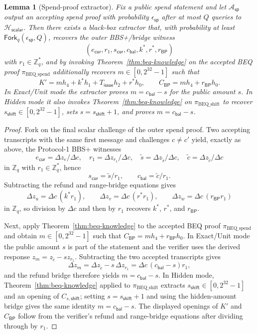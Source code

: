 \documentclass[11pt]{article}
\theoremstyle{definitionstyle}
\newtheorem{lemma}[theorem]{Lemma}
\theoremstyle{plain}
\begin{document}
\begin{lemma}[Spend-proof extractor]
\label{lem:spend-extractor}
Fix a public spend statement and let $\mathcal{A}_{\mathsf{sp}}$ output an accepting spend proof with probability $\epsilon_{\mathsf{sp}}$ after at most $Q$ queries to $\mathcal{H}_{\mathsf{scalar}}$. Then there exists a black-box extractor that, with probability at least $\mathsf{Fork}_q(\epsilon_{\mathsf{sp}},Q)$, recovers the outer BBS+/bridge witness
\[
(e_{\mathsf{cur}},r_1,s_{\mathsf{cur}},c_{\mathsf{bal}},k^*,r^*,r_{\mathsf{BP}})
\]
with $r_1 \in \mathbb{Z}_q^*$, and by invoking Theorem~\ref{thm:beq-knowledge} on the accepted BEQ proof $\pi_{\text{BEQ\_spend}}$ additionally recovers $m \in [0,2^{32}-1]$ such that
\[
K' = m h_4 + k^* h_1 + T_{\mathsf{issue}} h_2 + r^* h_0,
\qquad
C_{\mathsf{BP}} = m h_4 + r_{\mathsf{BP}} h_0.
\]
In Exact/Unit mode the extractor proves $m = c_{\mathsf{bal}}-s$ for the public amount $s$. In Hidden mode it also invokes Theorem~\ref{thm:beq-knowledge} on $\pi_{\text{BEQ\_shift}}$ to recover $s_{\mathsf{shift}} \in [0,2^{32}-1]$, sets $s = s_{\mathsf{shift}}+1$, and proves $m = c_{\mathsf{bal}}-s$.
\end{lemma}
\begin{proof}
Fork on the final scalar challenge of the outer spend proof. Two accepting transcripts with the same first message and challenges $c \neq c'$ yield, exactly as above, the Protocol-1 BBS+ witnesses
\[
e_{\mathsf{cur}} = \Delta z_e/\Delta c,\quad r_1 = \Delta z_{r_1}/\Delta c,\quad \tilde{s}=\Delta z_{\tilde{s}}/\Delta c,\quad \tilde{c}=\Delta z_{\tilde{c}}/\Delta c
\]
in $\mathbb{Z}_q$ with $r_1 \in \mathbb{Z}_q^*$, hence
\[
s_{\mathsf{cur}} = \tilde{s}/r_1,
\qquad
c_{\mathsf{bal}} = \tilde{c}/r_1.
\]
Subtracting the refund and range-bridge equations gives
\[
\Delta z_u = \Delta c\,(k^* r_1),\qquad \Delta z_v = \Delta c\,(r^* r_1),\qquad \Delta z_w = \Delta c\,(r_{\mathsf{BP}} r_1)
\]
in $\mathbb{Z}_q$, so division by $\Delta c$ and then by $r_1$ recovers $k^*$, $r^*$, and $r_{\mathsf{BP}}$.

Next, apply Theorem~\ref{thm:beq-knowledge} to the accepted BEQ proof $\pi_{\text{BEQ\_spend}}$ and obtain $m \in [0,2^{32}-1]$ such that $C_{\mathsf{BP}} = m h_4 + r_{\mathsf{BP}} h_0$. In Exact/Unit mode the public amount $s$ is part of the statement and the verifier uses the derived response $z_m = z_{\tilde{c}} - s z_{r_1}$. Subtracting the two accepted transcripts gives
\[
\Delta z_m = \Delta z_{\tilde{c}} - s\,\Delta z_{r_1} = \Delta c\,(c_{\mathsf{bal}}-s)r_1,
\]
and the refund bridge therefore yields $m = c_{\mathsf{bal}}-s$. In Hidden mode, Theorem~\ref{thm:beq-knowledge} applied to $\pi_{\text{BEQ\_shift}}$ extracts $s_{\mathsf{shift}} \in [0,2^{32}-1]$ and an opening of $C_{s,\mathsf{shift}}$; setting $s=s_{\mathsf{shift}}+1$ and using the hidden-amount bridge gives the same identity $m = c_{\mathsf{bal}}-s$. The displayed openings of $K'$ and $C_{\mathsf{BP}}$ follow from the verifier's refund and range-bridge equations after dividing through by $r_1$.
\end{proof}
\end{document}
